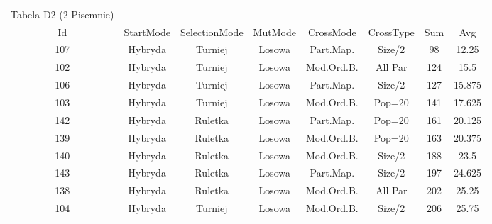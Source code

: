 \documentclass{article}
\begin{document}
\begin{table}[h!]
	\centering
	\begin{tabular}{c||c|c|c|c|c||c|c}
Tabela D2 (2 Pisemnie)\\
Id & StartMode & SelectionMode & MutMode & CrossMode & CrossType & Sum & Avg \\
\hline
107 & Hybryda & Turniej & Losowa & Part.Map. & Size/2 & 98 & 12.25 \\
102 & Hybryda & Turniej & Losowa & Mod.Ord.B. & All Par & 124 & 15.5 \\
106 & Hybryda & Turniej & Losowa & Part.Map. & Size/2 & 127 & 15.875 \\
103 & Hybryda & Turniej & Losowa & Mod.Ord.B. & Pop=20 & 141 & 17.625 \\
142 & Hybryda & Ruletka & Losowa & Part.Map. & Pop=20 & 161 & 20.125 \\
139 & Hybryda & Ruletka & Losowa & Mod.Ord.B. & Pop=20 & 163 & 20.375 \\
140 & Hybryda & Ruletka & Losowa & Mod.Ord.B. & Size/2 & 188 & 23.5 \\
143 & Hybryda & Ruletka & Losowa & Part.Map. & Size/2 & 197 & 24.625 \\
138 & Hybryda & Ruletka & Losowa & Mod.Ord.B. & All Par & 202 & 25.25 \\
104 & Hybryda & Turniej & Losowa & Mod.Ord.B. & Size/2 & 206 & 25.75 \\
	\end{tabular}
\end{table}
\end{document}
